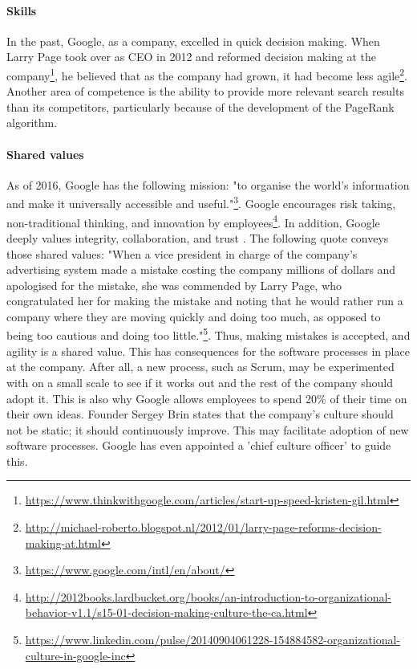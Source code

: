 \paragraph{Skills}
In the past, Google, as a company, excelled in quick decision making. When Larry Page took over as CEO in 2012 and reformed decision making at the company\footnote{\url{https://www.thinkwithgoogle.com/articles/start-up-speed-kristen-gil.html}}, he believed that as the company had grown, it had become less agile\footnote{\url{http://michael-roberto.blogspot.nl/2012/01/larry-page-reforms-decision-making-at.html}}. Another area of competence is the ability to provide more relevant search results than its competitors, particularly because of the development of the PageRank algorithm.

\paragraph{Shared values}
As of 2016, Google has the following mission: "to organise the world’s information and make it universally accessible and useful."\footnote{\url{https://www.google.com/intl/en/about/}}. Google encourages risk taking, non-traditional thinking, and innovation by employees\footnote{\url{http://2012books.lardbucket.org/books/an-introduction-to-organizational-behavior-v1.1/s15-01-decision-making-culture-the-ca.html}}. In addition, Google deeply values integrity, collaboration, and trust \citep{striebeck2006ssh}. The following quote conveys those shared values: "When a vice president in charge of the company’s advertising system made a mistake costing the company millions of dollars and apologised for the mistake, she was commended by Larry Page, who congratulated her for making the mistake and noting that he would rather run a company where they are moving quickly and doing too much, as opposed to being too cautious and doing too little."\footnote{\url{https://www.linkedin.com/pulse/20140904061228-154884582-organizational-culture-in-google-inc}}. Thus, making mistakes is accepted, and agility is a shared value. This has consequences for the software processes in place at the company. After all, a new process, such as Scrum, may be experimented with on a small scale to see if it works out and the rest of the company should adopt it. This is also why Google allows employees to spend 20\% of their time on their own ideas.
Founder Sergey Brin states that the company's culture should not be static; it should continuously improve. This may facilitate adoption of new software processes. Google has even appointed a 'chief culture officer' to guide this.

